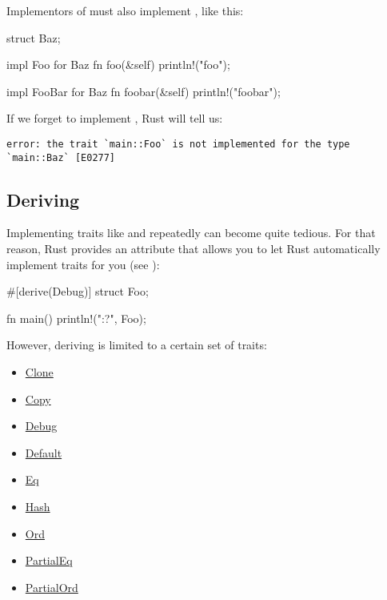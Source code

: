 Implementors of  must also implement , like this:

\begin{rustc}
struct Baz;

impl Foo for Baz {
    fn foo(&self) { println!("foo"); }
}

impl FooBar for Baz {
    fn foobar(&self) { println!("foobar"); }
}
\end{rustc}

If we forget to implement , Rust will tell us:

\begin{verbatim}
error: the trait `main::Foo` is not implemented for the type `main::Baz` [E0277]
\end{verbatim}

\subsection*{Deriving}

Implementing traits like  and  repeatedly can become quite tedious. For that reason, Rust provides an attribute 
that allows you to let Rust automatically implement traits for you (see ):

\begin{rustc}
#[derive(Debug)]
struct Foo;

fn main() {
    println!("{:?}", Foo);
}
\end{rustc}

However, deriving is limited to a certain set of traits:

\begin{itemize}
  \item{\href{https://doc.rust-lang.org/core/clone/trait.Clone.html}{Clone}}
  \item{\href{https://doc.rust-lang.org/core/marker/trait.Copy.html}{Copy}}
  \item{\href{https://doc.rust-lang.org/core/fmt/trait.Debug.html}{Debug}}
  \item{\href{https://doc.rust-lang.org/core/default/trait.Default.html}{Default}}
  \item{\href{https://doc.rust-lang.org/core/cmp/trait.Eq.html}{Eq}}
  \item{\href{https://doc.rust-lang.org/core/hash/trait.Hash.html}{Hash}}
  \item{\href{https://doc.rust-lang.org/core/cmp/trait.Ord.html}{Ord}}
  \item{\href{https://doc.rust-lang.org/core/cmp/trait.PartialEq.html}{PartialEq}}
  \item{\href{https://doc.rust-lang.org/core/cmp/trait.PartialOrd.html}{PartialOrd}}
\end{itemize}
